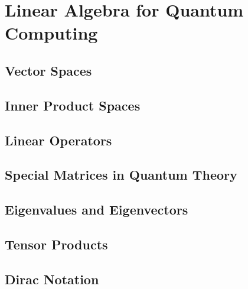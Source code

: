 \chapter{Linear Algebra for Quantum Computing}

\section{Vector Spaces}

\section{Inner Product Spaces}

\section{Linear Operators}

\section{Special Matrices in Quantum Theory}

\section{Eigenvalues and Eigenvectors}

\section{Tensor Products}

\section{Dirac Notation}





